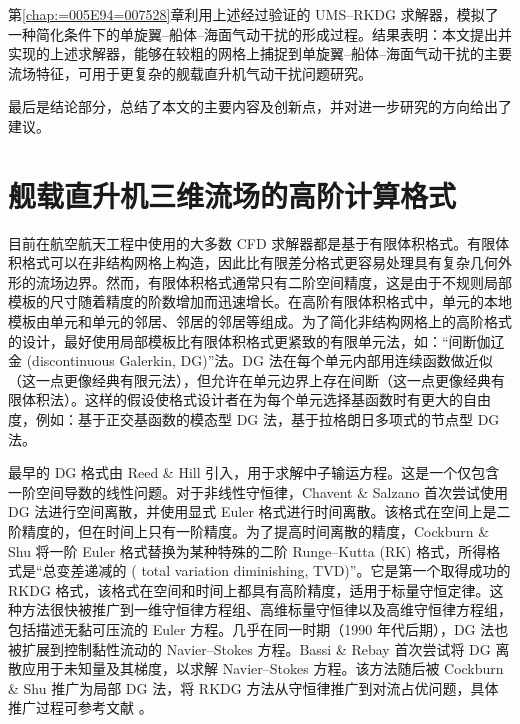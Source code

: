 第\ref{chap:=005E94=007528}章利用上述经过验证的 UMS–RKDG 求解器，模拟了一种简化条件下的单旋翼–船体–海面气动干扰的形成过程。结果表明：本文提出并实现的上述求解器，能够在较粗的网格上捕捉到单旋翼–船体–海面气动干扰的主要流场特征，可用于更复杂的舰载直升机气动干扰问题研究。

最后是结论部分，总结了本文的主要内容及创新点，并对进一步研究的方向给出了建议。

\chapter{舰载直升机三维流场的高阶计算格式\label{chap:=007B97=006CD5}}

目前在航空航天工程中使用的大多数 CFD 求解器都是基于有限体积格式。有限体积格式可以在非结构网格上构造，因此比有限差分格式更容易处理具有复杂几何外形的流场边界。然而，有限体积格式通常只有二阶空间精度，这是由于不规则局部模板的尺寸随着精度的阶数增加而迅速增长。在高阶有限体积格式中，单元的本地模板由单元和单元的邻居、邻居的邻居等组成。为了简化非结构网格上的高阶格式的设计，最好使用局部模板比有限体积格式更紧致的有限单元法，如：“间断伽辽金
(discontinuous Galerkin, DG)”法。DG 法在每个单元内部用连续函数做近似（这一点更像经典有限元法），但允许在单元边界上存在间断（这一点更像经典有限体积法）。这样的假设使格式设计者在为每个单元选择基函数时有更大的自由度，例如：基于正交基函数的模态型
DG 法，基于拉格朗日多项式的节点型 DG 法。

最早的 DG 格式由 Reed \& Hill 引入，用于求解中子输运方程。这是一个仅包含一阶空间导数的线性问题。对于非线性守恒律，Chavent
\& Salzano 首次尝试使用 DG 法进行空间离散，并使用显式 Euler 格式进行时间离散。该格式在空间上是二阶精度的，但在时间上只有一阶精度。为了提高时间离散的精度，Cockburn
\& Shu 将一阶 Euler 格式替换为某种特殊的二阶 Runge–Kutta (RK)
格式，所得格式是“总变差递减的 ( total variation diminishing,
TVD)”。它是第一个取得成功的 RKDG 格式，该格式在空间和时间上都具有高阶精度，适用于标量守恒定律。这种方法很快被推广到一维守恒律方程组、高维标量守恒律以及高维守恒律方程组，包括描述无黏可压流的
Euler 方程。几乎在同一时期（1990 年代后期），DG 法也被扩展到控制黏性流动的 Navier–Stokes 方程。Bassi
\& Rebay 首次尝试将 DG 离散应用于未知量及其梯度，以求解 Navier–Stokes
方程。该方法随后被 Cockburn \& Shu 推广为局部 DG 法，将 RKDG
方法从守恒律推广到对流占优问题，具体推广过程可参考文献 \cite{Cockburn_2001}。


